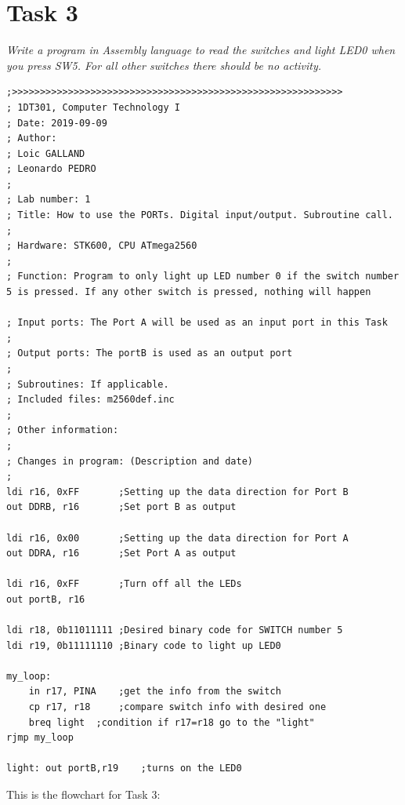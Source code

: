 \documentclass[a4paper,12pt]{article}
\begin{document}
\section{Task 3}
\textit{Write a program in Assembly language to read the switches and light LED0 when you
press SW5.
For all other switches there should be no activity.}

\lstset{style=Asm}
\begin{lstlisting}
;>>>>>>>>>>>>>>>>>>>>>>>>>>>>>>>>>>>>>>>>>>>>>>>>>>>>>>>>>>>
; 1DT301, Computer Technology I
; Date: 2019-09-09
; Author:
; Loic GALLAND
; Leonardo PEDRO
;
; Lab number: 1
; Title: How to use the PORTs. Digital input/output. Subroutine call.
;
; Hardware: STK600, CPU ATmega2560
;
; Function: Program to only light up LED number 0 if the switch number 5 is pressed. If any other switch is pressed, nothing will happen

; Input ports: The Port A will be used as an input port in this Task
;
; Output ports: The portB is used as an output port
;
; Subroutines: If applicable.
; Included files: m2560def.inc
;
; Other information:
;
; Changes in program: (Description and date)
;
ldi r16, 0xFF 		;Setting up the data direction for Port B
out DDRB, r16 		;Set port B as output

ldi r16, 0x00 		;Setting up the data direction for Port A
out DDRA, r16 		;Set Port A as output

ldi r16, 0xFF		;Turn off all the LEDs
out portB, r16

ldi r18, 0b11011111	;Desired binary code for SWITCH number 5
ldi r19, 0b11111110	;Binary code to light up LED0

my_loop:
	in r17, PINA 	;get the info from the switch
	cp r17, r18 	;compare switch info with desired one 
	breq light 	;condition if r17=r18 go to the "light"
rjmp my_loop

light: out portB,r19	;turns on the LED0
\end{lstlisting}
\newpage
This is the flowchart for Task 3:
\end{document}
